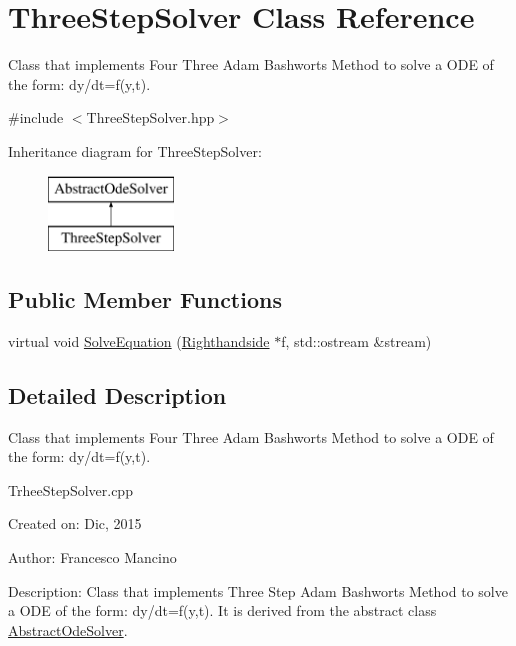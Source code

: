 \hypertarget{class_three_step_solver}{}\section{Three\+Step\+Solver Class Reference}
\label{class_three_step_solver}


Class that implements Four Three Adam Bashworts Method to solve a O\+D\+E of the form\+: dy/dt=f(y,t).  




{\ttfamily \#include $<$Three\+Step\+Solver.\+hpp$>$}

Inheritance diagram for Three\+Step\+Solver\+:\begin{figure}[H]
\begin{center}
\leavevmode
\includegraphics[height=2.000000cm]{class_three_step_solver}
\end{center}
\end{figure}
\subsection*{Public Member Functions}
\begin{DoxyCompactItemize}
\item 
virtual void \hyperlink{class_three_step_solver_a5c84debbe6e3497ab3c4b796e1f92cee}{Solve\+Equation} (\hyperlink{class_righthandside}{Righthandside} $\ast$f, std\+::ostream \&stream)
\end{DoxyCompactItemize}


\subsection{Detailed Description}
Class that implements Four Three Adam Bashworts Method to solve a O\+D\+E of the form\+: dy/dt=f(y,t). 

Trhee\+Step\+Solver.\+cpp

Created on\+: Dic, 2015 \begin{DoxyVerb}Author: Francesco Mancino
\end{DoxyVerb}


Description\+: Class that implements Three Step Adam Bashworts Method to solve a O\+D\+E of the form\+: dy/dt=f(y,t). It is derived from the abstract class \hyperlink{class_abstract_ode_solver}{Abstract\+Ode\+Solver}. 

